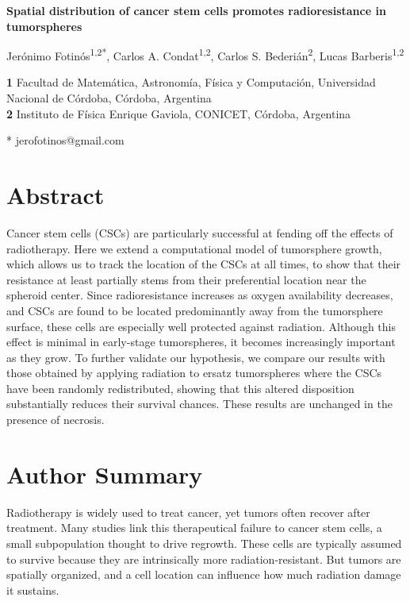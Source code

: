 \documentclass[10pt,letterpaper]{article}
\begin{document}
	\vspace*{0.2in}
\begin{flushleft}
	{\Large
		\textbf{Spatial distribution of cancer stem cells promotes radioresistance in tumorspheres}
	}
	\newline
	
	Jer\'onimo Fotin\'os\textsuperscript{1,2*},
	Carlos A. Condat\textsuperscript{1,2},
	Carlos S. Bederi\'an\textsuperscript{2},
	Lucas Barberis\textsuperscript{1,2}
	\\
	\bigskip
	
	\textbf{1} Facultad de Matem\'atica, Astronom\'ia, F\'isica y Computaci\'on, Universidad Nacional de C\'ordoba, C\'ordoba, Argentina\\
	\textbf{2} Instituto de F\'isica Enrique Gaviola, CONICET, C\'ordoba, Argentina\\
	\bigskip
	
	* jerofotinos@gmail.com
\end{flushleft}
\section*{Abstract}
Cancer stem cells (CSCs) are particularly successful at fending off the effects of radiotherapy. Here we extend a computational model of tumorsphere growth, which allows us to track the location of the CSCs at all times, to show that their resistance at least partially stems from their preferential location near the spheroid center. Since radioresistance increases as oxygen availability decreases, and CSCs are found to be located predominantly away from the tumorsphere surface, these cells are especially well protected against radiation. Although this effect is minimal in early-stage tumorspheres, it becomes increasingly important as they grow. To further validate our hypothesis, we compare our results with those obtained by applying radiation to ersatz tumorspheres where the CSCs have been randomly redistributed, showing that this altered disposition substantially reduces their survival chances. These results are unchanged in the presence of necrosis.

\section*{Author Summary}
Radiotherapy is widely used to treat cancer, yet tumors often recover after treatment. Many studies link this therapeutical failure to cancer stem cells, a small subpopulation thought to drive regrowth. These cells are typically assumed to survive because they are intrinsically more radiation-resistant. But tumors are spatially organized, and a cell location can influence how much radiation damage it sustains.
\end{document}
